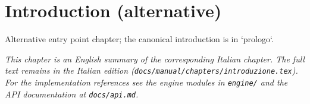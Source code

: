 \chapter{Introduction (alternative)}
\label{ch:introduzione_en}

Alternative entry point chapter; the canonical introduction is in `prologo`.

\medskip
\noindent
\textit{This chapter is an English summary of the corresponding Italian chapter. The full text remains in the Italian edition (\texttt{docs/manual/chapters/introduzione.tex}). For the implementation references see the engine modules in \texttt{engine/} and the API documentation at \texttt{docs/api.md}.}
